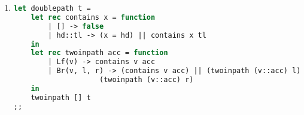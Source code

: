 \documentclass[10pt,\jkfside,a4paper]{article}
\begin{document}
\begin{enumerate}[label=(\alph*)]
\item

\begin{lstlisting}[language=Caml]
let doublepath t =
    let rec contains x = function
        | [] -> false
        | hd::tl -> (x = hd) || contains x tl
    in
    let rec twoinpath acc = function
        | Lf(v) -> contains v acc
        | Br(v, l, r) -> (contains v acc) || (twoinpath (v::acc) l) || 
					(twoinpath (v::acc) r)
    in
    twoinpath [] t
;;
\end{lstlisting}

\end{enumerate}
\end{document}
